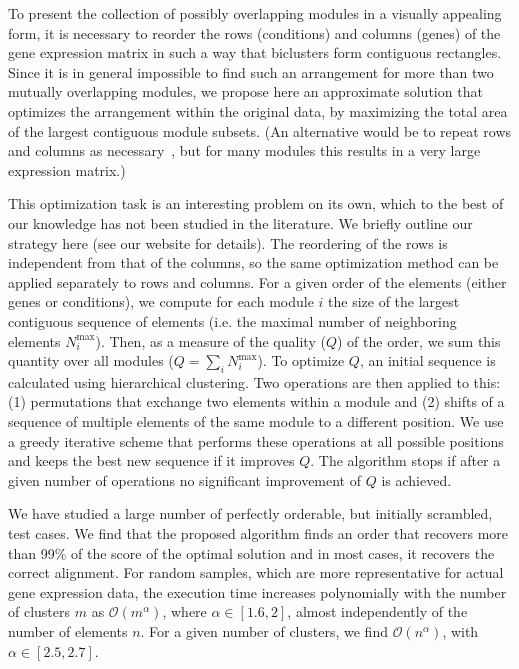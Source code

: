 \documentclass[round]{bioinfo}
\begin{document}
To present the collection of possibly overlapping modules in a visually
appealing form, it is necessary to reorder the rows (conditions) and
columns (genes) of the gene expression matrix in such a way that
biclusters form contiguous
rectangles. Since it is in general impossible to find such an
arrangement for more than two mutually overlapping modules, we propose
here an approximate solution that optimizes the arrangement within the
original data, by maximizing the total area of the largest contiguous
module subsets. (An alternative would be to repeat rows and columns as
necessary~\citep{grothaus06}, but for many modules this results in
a very large expression matrix.)

This optimization task is an interesting problem on its own, which to
the best of our knowledge has not been studied in the literature.
We briefly outline our strategy here (see our website for details).
The reordering of the rows is independent from that of the columns,
so the same optimization method can be applied separately
to rows and columns. For a given order of the
elements (either genes or conditions), we compute for each module $i$ the
size of the largest contiguous sequence of elements (i.e. the maximal
number of neighboring elements $N^\text{max}_i$). Then, as a measure of the
quality ($Q$) of the order, we sum this quantity over all modules
($Q=\sum_i N^\text{max}_i$). To optimize $Q$, an initial sequence is calculated using
hierarchical clustering. Two operations are then applied to this: (1)
permutations that exchange two elements within a module and (2) shifts
of a sequence of multiple elements of the same module to a different position. We
use a greedy iterative scheme that performs these operations at
all possible positions and keeps the best new sequence if it improves
$Q$. The algorithm stops if after a given number of operations no
significant improvement of $Q$ is achieved.

We have studied a large number of perfectly orderable, but initially
scrambled, test cases. We find that the proposed algorithm finds an
order that recovers more than 99\% of the score of the optimal
solution and in most cases, it recovers the correct
alignment. For random samples, which are more representative for
actual gene expression data, the execution time increases polynomially
with the number of clusters $m$ as ${\mathcal O}(m^\alpha)$, where
$\alpha \in [1.6, 2]$, almost independently of the number of elements
$n$. For a given number of clusters, we find ${\mathcal O}(n^\alpha)$,
with $\alpha \in [2.5, 2.7]$.
\end{document}
